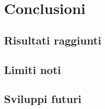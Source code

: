 \chapter{Conclusioni}

\section{Risultati raggiunti}

\section{Limiti noti}

\section{Sviluppi futuri}
